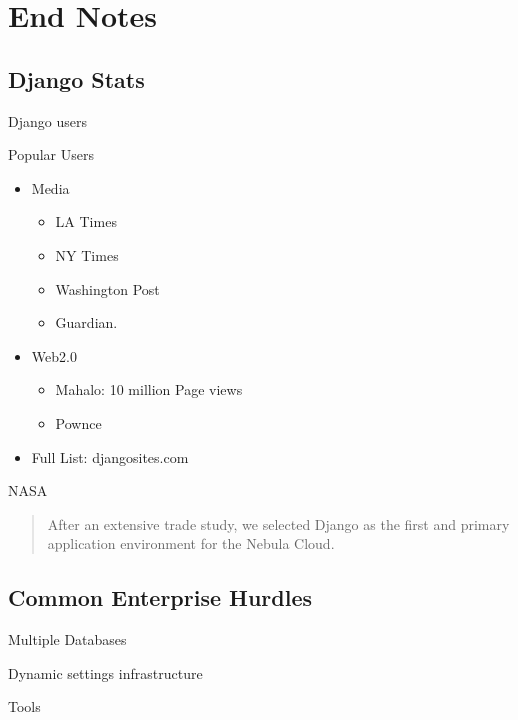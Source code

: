 \documentclass[19.9pt]{beamer}
\begin{document}
\section{End Notes}
	\subsection{Django Stats}
		\begin{frame}
			{Django users}
		\end{frame}
		\begin{frame}
		{Popular Users}
		\begin{itemize}[<+-| alert@+>]
		 \item                                                 
			Media
			\begin{itemize}
			    \item 
				LA Times
				\item
				NY Times
				 \item
				Washington Post
				 \item
				Guardian.
			\end{itemize}
		 \item
			Web2.0
			\begin{itemize}            
				\item 
				Mahalo: 10 million Page views            
				\item
				Pownce
			\end{itemize}
		\item
			Full List: djangosites.com
		\end{itemize}
		\end{frame}
		\begin{frame}
			{NASA}
			\begin{quotation}
			After an extensive trade study, we selected Django as the ﬁrst and primary application environment for the Nebula Cloud.
			\end{quotation} 
		\end{frame}
	\subsection{Common Enterprise Hurdles}
		\begin{frame}
			{Multiple Databases}
		\end{frame}
		\begin{frame}
			{Dynamic settings infrastructure}
		\end{frame}
		\begin{frame}
			{Tools}
		\end{frame}
	
\end{document}
